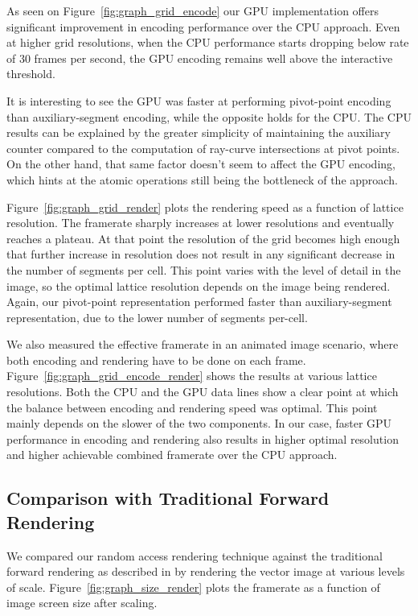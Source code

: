 \documentclass[11pt,a4paper,twoside]{article}
\begin{document}
As seen on Figure~\ref{fig:graph_grid_encode} our GPU implementation offers significant improvement in encoding performance over the CPU approach. Even at higher grid resolutions, when the CPU performance starts dropping below rate of 30 frames per second, the GPU encoding remains well above the interactive threshold.

It is interesting to see the GPU was faster at performing pivot-point encoding than auxiliary-segment encoding, while the opposite holds for the CPU. The CPU results can be explained by the greater simplicity of maintaining the auxiliary counter compared to the computation of ray-curve intersections at pivot points. On the other hand, that same factor doesn't seem to affect the GPU encoding, which hints at the atomic operations still being the bottleneck of the approach.

Figure~\ref{fig:graph_grid_render} plots the rendering speed as a function of lattice resolution. The framerate sharply increases at lower resolutions and eventually reaches a plateau. At that point the resolution of the grid becomes high enough that further increase in resolution does not result in any significant decrease in the number of segments per cell. This point varies with the level of detail in the image, so the optimal lattice resolution depends on the image being rendered. Again, our pivot-point representation performed faster than auxiliary-segment representation, due to the lower number of segments per-cell.

We also measured the effective framerate in an animated image scenario, where both encoding and rendering have to be done on each frame. Figure~\ref{fig:graph_grid_encode_render} shows the results at various lattice resolutions. Both the CPU and the GPU data lines show a clear point at which the balance between encoding and rendering speed was optimal. This point mainly depends on the slower of the two components. In our case, faster GPU performance in encoding and rendering also results in higher optimal resolution and higher achievable combined framerate over the CPU approach.

\subsection {Comparison with Traditional Forward Rendering}

We compared our random access rendering technique against the traditional forward rendering as described in \cite{Kokojima06} by rendering the vector image at various levels of scale. Figure~\ref{fig:graph_size_render} plots the framerate as a function of image screen size after scaling.
\end{document}
